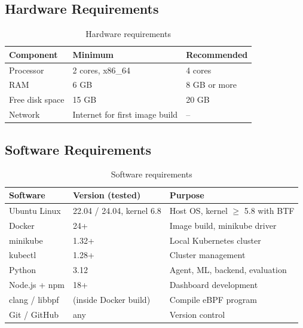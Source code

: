 \subsection{Hardware Requirements}

\begin{table}[H]
\centering
\caption{Hardware requirements}
\label{tab:hw}
\begin{tabular}{lll}
\toprule
\textbf{Component} & \textbf{Minimum} & \textbf{Recommended} \\
\midrule
Processor & 2 cores, x86\_64 & 4 cores \\
RAM & 6 GB & 8 GB or more \\
Free disk space & 15 GB & 20 GB \\
Network & Internet for first image build & -- \\
\bottomrule
\end{tabular}
\end{table}

\subsection{Software Requirements}

\begin{table}[H]
\centering
\caption{Software requirements}
\label{tab:sw}
\begin{tabular}{lll}
\toprule
\textbf{Software} & \textbf{Version (tested)} & \textbf{Purpose} \\
\midrule
Ubuntu Linux & 22.04 / 24.04, kernel 6.8 & Host OS, kernel $\geq$ 5.8 with BTF \\
Docker & 24+ & Image build, minikube driver \\
minikube & 1.32+ & Local Kubernetes cluster \\
kubectl & 1.28+ & Cluster management \\
Python & 3.12 & Agent, ML, backend, evaluation \\
Node.js + npm & 18+ & Dashboard development \\
clang / libbpf & (inside Docker build) & Compile eBPF program \\
Git / GitHub & any & Version control \\
\bottomrule
\end{tabular}
\end{table}
